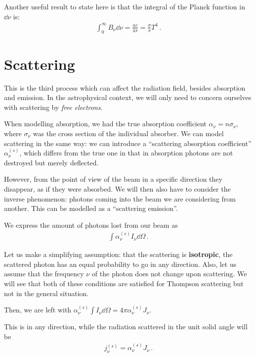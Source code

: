 \documentclass[main.tex]{subfiles}
\begin{document}
Another useful result to state here is that the integral of the Planck function in \(\dd{\nu }\) is:
%
\begin{align}
\int_{0}^{\infty } B_\nu \dd{\nu } = \frac{uc}{4 \pi } = \frac{\sigma }{\pi } T^{4}
\,.
\end{align}

\section{Scattering}

This is the third process which can affect the radiation field, besides absorption and emission. 
In the astrophysical context, we will only need to concern ourselves with scattering by \emph{free electrons}. 

When modelling absorption, we had the true absorption coefficient \(\alpha_{\nu } = n \sigma_{\nu }\), where \(\sigma_{\nu }\) was the cross section of the individual absorber. 
We can model scattering in the same way: we can introduce a ``scattering absorption coefficient'' \(\alpha_{\nu}^{(s)}\), which differs from the true one in that in absorption photons are not destroyed but merely deflected. 

However, from the point of view of the beam in a specific direction they disappear, as if they were absorbed. 
We will then also have to consider the inverse phenomenon: photons coming into the beam we are considering from another. 
This can be modelled as a ``scattering emission''. 

We express the amount of photons lost from our beam as 
%
\begin{align}
\int \alpha^{(s)}_{\nu } I_\nu \dd{\Omega }
\,.
\end{align}

Let us make a simplifying assumption: that the scattering is \textbf{isotropic}, the scattered photon has an equal probability to go in any direction. Also, let us assume that the frequency \(\nu \) of the photon does not change upon scattering. 
We will see that both of these conditions are satisfied for Thompson scattering but not in the general situation. 

Then, we are left with \(\alpha_{\nu }^{(s)} \int I_\nu \dd{\Omega } = 4 \pi \alpha_{\nu }^{(s)} J_\nu \). 

This is in any direction, while the radiation scattered in the unit solid angle will be 
%
\begin{align}
j_{\nu }^{(s)} = \alpha_{\nu }^{(s)} J_\nu 
\,.
\end{align}
\end{document}
